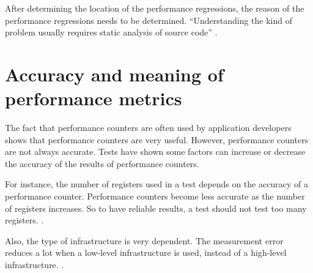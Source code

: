 After determining the location of the performance regressions, the reason of the performance regressions needs to be determined. ``Understanding the kind of problem usually requires static analysis of source code'' \cite{nguyen2012using}.

\section{Accuracy and meaning of performance metrics}
The fact that performance counters are often used by application developers shows that performance counters are very useful. However, performance counters are not always accurate. Tests have shown some factors can increase or decrease the accuracy of the results of performance counters. \cite{AccuracyPerformanceCounter}

For instance, the number of registers used in a test depends on the accuracy of a performance counter. Performance counters become less accurate as the number of registers increases. So to have reliable results, a test should not test too many registers. \cite{AccuracyPerformanceCounter}.

Also, the type of infrastructure is very dependent. The measurement error reduces a lot when a low-level infrastructure is used, instead of a high-level infrastructure. \cite{AccuracyPerformanceCounter}.

